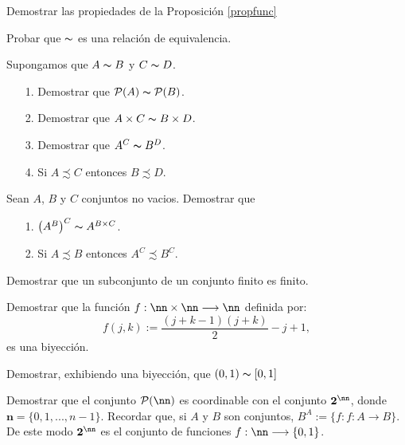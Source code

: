 \begin{ejercicio}\label{3} Demostrar las propiedades de la
Proposici\'on \vref{propfunc}
\end{ejercicio}
\begin{ejercicio}\label{1} Probar que $\thicksim$ es una
relaci\'on de equivalencia.
\end{ejercicio}
\begin{ejercicio}\label{1.2} Supongamos que $A\thicksim B$ y
$C\thicksim D$.
\begin{itemize}
\item[1.] Demostrar que $\mathcal{P}(A)\thicksim \mathcal{P}(B)$.
\item[2.] Demostrar que $A\times C\thicksim B\times D$.
\item[3.] Demostrar que $A^C\thicksim B^D$.
\item[4.] Si $A\precsim C$ entonces $B\precsim D$.
\end{itemize}
\end{ejercicio}
\begin{ejercicio}\label{potdelapot} Sean $A$, $B$ y $C$ conjuntos
no vacios. Demostrar que
\begin{itemize}
\item[1.] $\bigl(A^{B}\bigr)^C\thicksim A^{B\times C}$.
\item[2.] Si $A\precsim B$ entonces $A^C\precsim B^C$.
\end{itemize}
\end{ejercicio}

\begin{ejercicio}\label{1.5} Demostrar que un subconjunto de un conjunto
finito es finito.
\end{ejercicio}
\begin{ejercicio}\label{2} Demostrar que la funci\'on
$f:\nn\times\nn\longrightarrow\nn$ definida por:
\[f(j,k):=\frac{(j+k-1)(j+k)}{2}-j+1,\]
es una biyecci\'on.
\end{ejercicio}
\begin{ejercicio}\label{5} Demostrar, exhibiendo una biyecci\'on, que $(0,1)\thicksim [0,1]$
\end{ejercicio}
\begin{ejercicio}\label{6} Demostrar que el conjunto
$\mathcal{P}(\nn)$ es coordinable con el conjunto
$\mathbf{2}^{\nn}$, donde $\mathbf{n}=\{0,1,...,n-1\}$. Recordar
que, si $A$ y $B$ son conjuntos, $B^A:=\{f:f:A\longrightarrow
B\}$. De este modo $\mathbf{2}^{\nn}$ es el conjunto de funciones
$f:\nn\longrightarrow \{0,1\}$.
\end{ejercicio}

